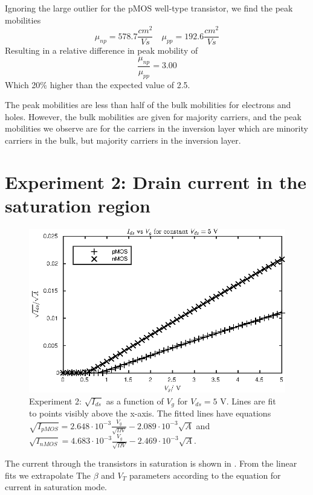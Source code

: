 Ignoring the large outlier for the pMOS well-type transistor, we find the peak mobilities
\begin{equation*}
    \mu_{np} = 578.7 \frac{cm^2}{V s} \quad \mu_{pp} = 192.6 \frac{cm^2}{V s}
\end{equation*}
Resulting in a relative difference in peak mobility of
\begin{equation*}
    \frac{\mu_{np}}{\mu_{pp}} = 3.00
\end{equation*}
Which 20\% higher than the expected value of 2.5.

The peak mobilities are less than half of the bulk mobilities for electrons and holes. However, the bulk mobilities are 
given for majority carriers, and the peak mobilities we observe are for the carriers in the inversion layer which are 
minority carriers in the bulk, but majority carriers in the inversion layer.
\section{Experiment 2: Drain current in the saturation region}
\begin{figure}[!htb]
    \center
    \includegraphics{ex2.eps}
    \caption{Experiment 2: \(\sqrt{I_{ds}}\) as a function of \(V_g\) for \(V_{ds} = 5\) V. Lines are fit to points visibly above the
        x-axis. The fitted lines have equations \(\sqrt{I_{pMOS}} = 2.648\cdot10^{-3} \frac{V_g}{\sqrt{\Omega V}} - 2.089\cdot10^{-3} \sqrt{A}\) and 
    \(\sqrt{I_{nMOS}} = 4.683\cdot10^{-3} \frac{V_g}{\sqrt{\Omega V}} - 2.469\cdot10^{-3}\sqrt{A}\).}
    \label{fig:ex2}
\end{figure}
The current through the transistors in saturation is shown in . From the linear fits we extrapolate
The \(\beta\) and \(V_T\) parameters according to the equation for current in saturation mode.

